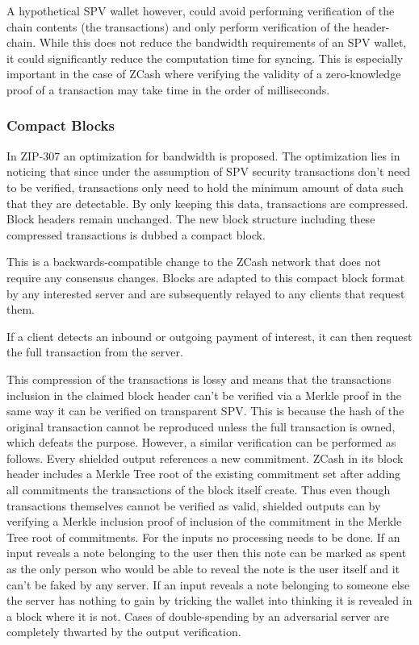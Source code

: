 \documentclass[sigconf,authordraft]{acmart}
\begin{document}
A hypothetical SPV wallet however, could avoid performing verification of the chain contents (the transactions) and only perform verification of the header-chain. While this does not reduce the bandwidth requirements of an SPV wallet, it could significantly reduce the computation time for syncing. This is especially important in the case of ZCash where verifying the validity of a zero-knowledge proof of a transaction may take time in the order of milliseconds.

\subsubsection{Compact Blocks}
In ZIP-307 an optimization for bandwidth is proposed. The optimization lies in noticing that since under the assumption of SPV security transactions don't need to be verified, transactions only need to hold the minimum amount of data such that they are detectable. By only keeping this data, transactions are compressed. Block headers remain unchanged. The new block structure including these compressed transactions is dubbed a compact block.

This is a backwards-compatible change to the ZCash network that does not require any consensus changes. Blocks are adapted to this compact block format by any interested server and are subsequently relayed to any clients that request them.

If a client detects an inbound or outgoing payment of interest, it can then request the full transaction from the server.

This compression of the transactions is lossy and means that the transactions inclusion in the claimed block header can't be verified via a Merkle proof in the same way it can be verified on transparent SPV. This is because the hash of the original transaction cannot be reproduced unless the full transaction is owned, which defeats the purpose. However, a similar verification can be performed as follows. Every shielded output references a new commitment. ZCash in its block header includes a Merkle Tree root of the existing commitment set after adding all commitments the transactions of the block itself create. Thus even though transactions themselves cannot be verified as valid, shielded outputs can by verifying a Merkle inclusion proof of inclusion of the commitment in the Merkle Tree root of commitments. For the inputs no processing needs to be done. If an input reveals a note belonging to the user then this note can be marked as spent as the only person who would be able to reveal the note is the user itself and it can't be faked by any server. If an input reveals a note belonging to someone else the server has nothing to gain by tricking the wallet into thinking it is revealed in a block where it is not. Cases of double-spending by an adversarial server are completely thwarted by the output verification.
\end{document}
